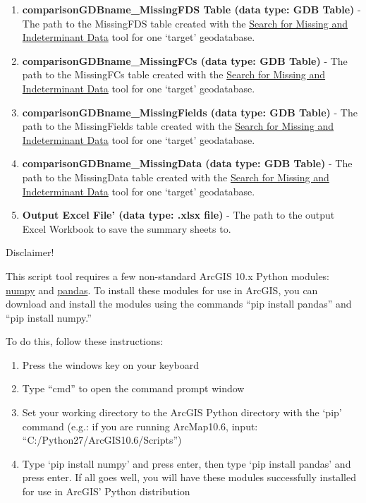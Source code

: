 \documentclass[openany]{book}
\providecommand{\tightlist}{%
  \setlength{\itemsep}{0pt}\setlength{\parskip}{0pt}}
\theoremstyle{definition}
\theoremstyle{definition}
\theoremstyle{definition}
\theoremstyle{remark}
\let\BeginKnitrBlock\begin \let\EndKnitrBlock\end
\begin{document}
\begin{enumerate}
\def\labelenumi{\arabic{enumi}.}
\tightlist
\item
  \textbf{comparisonGDBname\_MissingFDS Table (data type: GDB Table)} -
  The path to the MissingFDS table created with the
  \protect\hyperlink{indtSearch}{Search for Missing and Indeterminant
  Data} tool for one `target' geodatabase.
\item
  \textbf{comparisonGDBname\_MissingFCs (data type: GDB Table)} - The
  path to the MissingFCs table created with the
  \protect\hyperlink{indtSearch}{Search for Missing and Indeterminant
  Data} tool for one `target' geodatabase.
\item
  \textbf{comparisonGDBname\_MissingFields (data type: GDB Table)} - The
  path to the MissingFields table created with the
  \protect\hyperlink{indtSearch}{Search for Missing and Indeterminant
  Data} tool for one `target' geodatabase.
\item
  \textbf{comparisonGDBname\_MissingData (data type: GDB Table)} - The
  path to the MissingData table created with the
  \protect\hyperlink{indtSearch}{Search for Missing and Indeterminant
  Data} tool for one `target' geodatabase.
\item
  \textbf{Output Excel File' (data type: .xlsx file)} - The path to the
  output Excel Workbook to save the summary sheets to.
\end{enumerate}

\BeginKnitrBlock{warnh1}
Disclaimer!
\EndKnitrBlock{warnh1} \BeginKnitrBlock{warnp}

This script tool requires a few non-standard ArcGIS 10.x Python modules:
\href{http://www.numpy.org/}{numpy} and
\href{https://pandas.pydata.org/}{pandas}. To install these modules for
use in ArcGIS, you can download and install the modules using the
commands ``pip install pandas'' and ``pip install numpy.''

To do this, follow these instructions:

\begin{enumerate}
\def\labelenumi{\arabic{enumi}.}
\tightlist
\item
  Press the windows key on your keyboard
\item
  Type ``cmd'' to open the command prompt window
\item
  Set your working directory to the ArcGIS Python directory with the
  `pip' command (e.g.: if you are running ArcMap10.6, input:
  ``C:/Python27/ArcGIS10.6/Scripts'')
\item
  Type `pip install numpy' and press enter, then type `pip install
  pandas' and press enter. If all goes well, you will have these modules
  successfully installed for use in ArcGIS' Python distribution
\end{enumerate}
\EndKnitrBlock{warnp}
\end{document}
